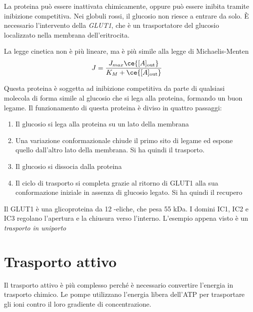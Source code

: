 La proteina può essere inattivata chimicamente, oppure può essere inibita tramite inibizione competitiva.
Nei globuli rossi, il glucosio non riesce a entrare da solo. È necessario l'intervento della \emph{GLUT1}, che è un trasportatore del glucosio localizzato nella membrana dell'eritrocita.


La legge cinetica non è più lineare, ma è più simile alla legge di Michaelis-Menten
\[
J = \frac{J_{max} \ce{[A]_{\text{out}}}}{K_M + \ce{[A]_{\text{out}}}}
\]


Questa proteina è soggetta ad inibizione competitiva da parte di qualsiasi molecola di forma simile al glucosio che si lega alla proteina, formando un buon legame. Il funzionamento di questa proteina è diviso in quattro passaggi:
\begin{enumerate}
\item Il glucosio si lega alla proteina su un lato della membrana
\item Una variazione conformazionale chiude il primo sito di legame ed espone quello dall'altro lato della membrana. Si ha quindi il trasporto.
\item Il glucosio si dissocia dalla proteina
\item Il ciclo di trasporto si completa grazie al ritorno di GLUT1 alla sua conformazione iniziale in assenza di glucosio legato. Si ha quindi il recupero
\end{enumerate}

Il GLUT1 è una glicoproteina da 12 \alpha-eliche, che pesa 55 kDa. I domini IC1, IC2 e IC3 regolano l'apertura e la chiusura verso l'interno.
L'esempio appena visto è un \emph{trasporto in uniporto}



\section{Trasporto attivo}

Il trasporto attivo è più complesso perché è necessario convertire l'energia in trasporto chimico. Le pompe utilizzano l'energia libera dell'ATP per trasportare gli ioni contro il loro gradiente di concentrazione.

